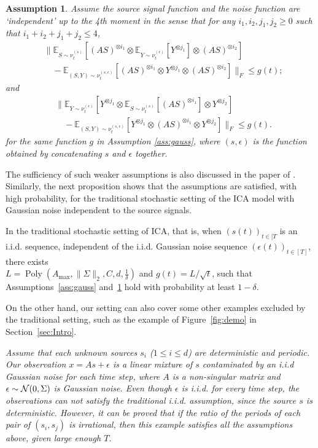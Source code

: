 \documentclass[twoside,11pt]{article}
\newcommand{\cN}{\cal{N}}
\newcommand{\E}{\mathbb{E}}
\newcommand{\iid}{i.i.d.\xspace}
\DeclareMathOperator{\pol}{Poly}
\newcommand{\poly}[1]{\pol\left(#1\right)}
\newtheorem{assumption}{Assumption}
\newcommand{\eps}{\epsilon}
\begin{document}
\begin{assumption}
\label{ass:independence}
Assume the source signal function and the noise function are `independent' up to the 4th moment in the sense that for any $i_1,i_2,j_1,j_2 \ge 0$ such that $i_1+i_2+j_1+j_2 \le 4$,  
\begin{align*}
& \| \E_{S\sim \nu_t^{(s)}} [(AS)^{\otimes i_1}\otimes \E_{Y\sim \nu_t^{(\epsilon)}} [Y^{\otimes j_1}] \otimes (AS)^{\otimes i_2}]\\
& \quad - \E_{(S, Y)\sim \nu_t^{(s, \epsilon)}} [(AS)^{\otimes i_1}\otimes Y^{\otimes j_1}\otimes (AS)^{\otimes i_2}]  \|_F 
 \le g(t); %
\end{align*}
and 
\begin{align*}
& \| \E_{Y\sim \nu_t^{(\epsilon)}} [Y^{\otimes j_1} \otimes \E_{S\sim \nu_t^{(s)}} [(AS)^{\otimes i_1}] \otimes Y^{\otimes j_2}] \\
& \quad - \E_{(S, Y)\sim \nu_t^{(s, \epsilon)}} [ Y^{\otimes j_1}\otimes (AS)^{\otimes i_1}\otimes Y^{\otimes j_2}] \|_F 
\le g(t). %
\end{align*}
for the same function $g$ in Assumption \ref{ass:gauss}, where $(s,\epsilon)$ is the function obtained by concatenating $s$ and $\epsilon$ together.  
\end{assumption}
The sufficiency of such weaker assumptions is also discussed in the paper of \citet{frieze1996learning}.
Similarly, the next proposition shows that the assumptions are satisfied, with high probability, for the traditional stochastic setting of the ICA model with Gaussian noise independent to the source signals.
\begin{proposition}
\label{prop:stochasticAss}
In the traditional stochastic setting of ICA, that is, when $(s(t))_{t\in[T}$ is an \iid sequence, independent of the \iid Gaussian noise sequence $(\epsilon(t))_{t\in[T]}$, there exists \\ $L = \poly{A_{\max}, \|\Sigma\|_2, C, d,\frac{1}{\delta}}$ and $g(t) = L/\sqrt{t}$, such that Assumptions~\ref{ass:gauss} and~\ref{ass:independence} hold with probability at least $1-\delta$.
\end{proposition}
On the other hand, our setting can also cover some other examples excluded by the traditional setting, such as the example of Figure~\ref{fig:demo} in Section~\ref{sec:Intro}.
\begin{example} \em
Assume that each unknown sources $s_i$ ($1\le i\le d$) are deterministic and periodic. Our observation $x=As+\eps$ is a linear mixture of $s$ contaminated by an i.i.d Gaussian noise for each time step, where $A$ is a non-singular matrix and $\eps\sim {\cN}(0,\Sigma)$ is Gaussian noise.   
Even though $\eps$ is i.i.d. for every time step, the observations can not satisfy the traditional i.i.d. assumption, since the source $s$ is deterministic. However, it can be proved that if the ratio of the periods of each pair of $(s_i, s_j)$ is irrational, then this example satisfies all the assumptions above, given large enough $T$.   
\end{example}
\end{document}
